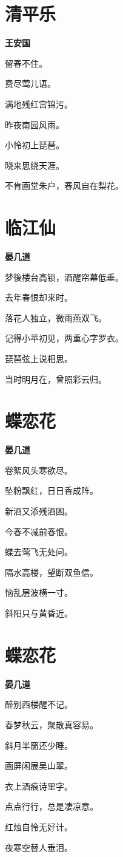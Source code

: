 \documentclass[12pt,a4paper]{ctexbook}
\begin{document}
\section{清平乐}
\textbf{王安国}\par\vspace{0.5em}
留春不住。\par
费尽莺儿语。\par
满地残红宫锦污。\par
昨夜南园风雨。\par
小怜初上琵琶。\par
晓来思绕天涯。\par
不肯画堂朱户，春风自在梨花。\par

\section{临江仙}
\textbf{晏几道}\par\vspace{0.5em}
梦後楼台高锁，酒醒帘幕低垂。\par
去年春恨却来时。\par
落花人独立，微雨燕双飞。\par
记得小苹初见，两重心字罗衣。\par
琵琶弦上说相思。\par
当时明月在，曾照彩云归。\par

\section{蝶恋花}
\textbf{晏几道}\par\vspace{0.5em}
卷絮风头寒欲尽。\par
坠粉飘红，日日香成阵。\par
新酒又添残酒困。\par
今春不减前春恨。\par
蝶去莺飞无处问。\par
隔水高楼，望断双鱼信。\par
恼乱层波横一寸。\par
斜阳只与黄昏近。\par

\section{蝶恋花}
\textbf{晏几道}\par\vspace{0.5em}
醉别西楼醒不记。\par
春梦秋云，聚散真容易。\par
斜月半窗还少睡。\par
画屏闲展吴山翠。\par
衣上酒痕诗里字。\par
点点行行，总是凄凉意。\par
红烛自怜无好计。\par
夜寒空替人垂泪。\par
\end{document}
